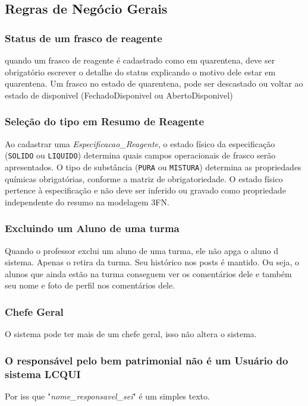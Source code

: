 \documentclass[12pt,a4paper]{article}
\begin{document}
\subsection{Regras de Negócio Gerais}
\subsubsection{Status de um frasco de reagente}
\begin{regra}
quando um frasco de reagente é cadastrado como em quarentena, deve ser obrigatório escrever o detalhe do status explicando o motivo dele estar em quarentena. 
Um frasco no estado de quarentena, pode ser descastado ou voltar ao estado de disponivel (FechadoDisponivel ou AbertoDisponivel)
\end{regra}
\subsubsection{Seleção do tipo em Resumo de Reagente}
\begin{regra}
Ao cadastrar uma \textit{Especificacao\_Reagente}, o estado físico da especificação (\texttt{SOLIDO} ou \texttt{LIQUIDO}) determina quais campos operacionais de frasco serão apresentados. O tipo de substância (\texttt{PURA} ou \texttt{MISTURA}) determina as propriedades químicas obrigatórias, conforme a matriz de obrigatoriedade. O estado físico pertence à especificação e não deve ser inferido ou gravado como propriedade independente do resumo na modelagem 3FN. \\
\end{regra}
\subsubsection{Excluindo um Aluno de uma turma}
\begin{regra}
Quando o professor exclui um aluno de uma turma, ele não apga o aluno d sistema. Apenas o retira da turma. Seu histórico nos posts é mantido. Ou seja, o alunos que ainda estão na turma conseguem ver os comentários dele e também seu nome e foto de perfil nos comentários dele.
\end{regra}
\subsubsection{Chefe Geral}
\begin{regra}
O sistema pode ter mais de um chefe geral, isso não altera o sistema. 
\end{regra}
\subsubsection{O responsável pelo bem patrimonial não é um Usuário do sistema LCQUI}
\begin{regra}
Por iss que "\textit{nome\_responsavel\_sei}" é um simples texto.
\end{regra}
\end{document}
